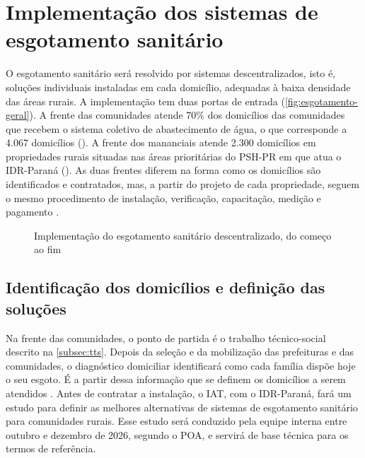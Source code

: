 \section{Implementação dos sistemas de esgotamento sanitário}
\label{sec:esgotamento}

O esgotamento sanitário será resolvido por sistemas descentralizados, isto é,
soluções individuais instaladas em cada domicílio, adequadas à baixa
densidade das áreas rurais. A implementação tem duas portas de entrada
(\autoref{fig:esgotamento-geral}). A frente das comunidades atende 70\% dos
domicílios das comunidades que recebem o sistema coletivo de abastecimento
de água, o que corresponde a 4.067 domicílios (). A
frente dos mananciais atende 2.300 domicílios em propriedades rurais
situadas nas áreas prioritárias do PSH-PR em que atua o IDR-Paraná
(). As duas frentes diferem na forma como os domicílios
são identificados e contratados, mas, a partir do projeto de cada
propriedade, seguem o mesmo procedimento de instalação, verificação,
capacitação, medição e pagamento \cite{mop2026}.

\begin{figure}[htbp]
  \centering
  \caption{Implementação do esgotamento sanitário descentralizado, do começo ao fim}
  \label{fig:esgotamento-geral}
\end{figure}

\subsection{Identificação dos domicílios e definição das soluções}
\label{subsec:esgotamento-demanda}

Na frente das comunidades, o ponto de partida é o trabalho técnico-social
descrito na \autoref{subsec:tts}. Depois da seleção e da mobilização das
prefeituras e das comunidades, o diagnóstico domiciliar identificará como
cada família dispõe hoje o seu esgoto. É a partir dessa informação que se
definem os domicílios a serem atendidos \cite{mop2026}. Antes de contratar a
instalação, o IAT, com o IDR-Paraná, fará um estudo para definir as melhores
alternativas de sistemas de esgotamento sanitário para comunidades rurais.
Esse estudo será conduzido pela equipe interna entre outubro e dezembro de
2026, segundo o POA, e servirá de base técnica para os termos de referência.


